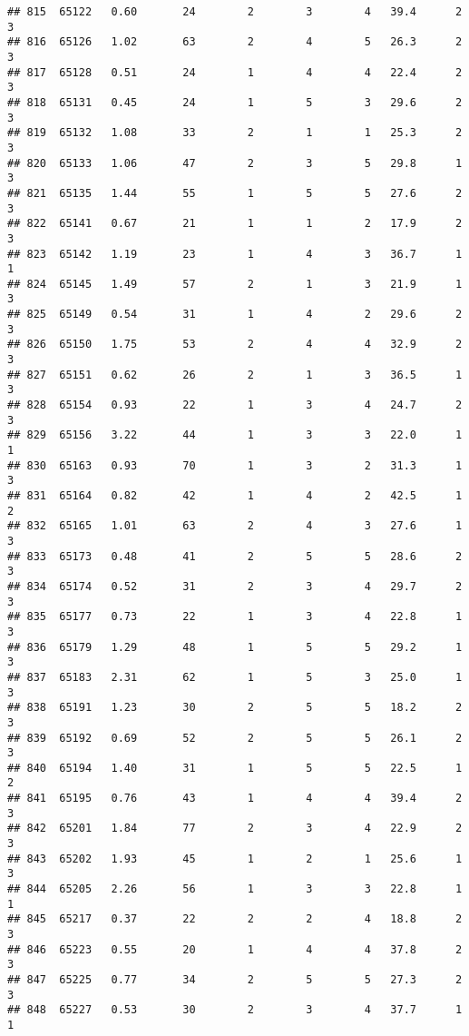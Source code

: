 \documentclass[
]{article}
\begin{document}
\begin{verbatim}
## 815  65122   0.60       24        2        3        4   39.4      2      3
## 816  65126   1.02       63        2        4        5   26.3      2      3
## 817  65128   0.51       24        1        4        4   22.4      2      3
## 818  65131   0.45       24        1        5        3   29.6      2      3
## 819  65132   1.08       33        2        1        1   25.3      2      3
## 820  65133   1.06       47        2        3        5   29.8      1      3
## 821  65135   1.44       55        1        5        5   27.6      2      3
## 822  65141   0.67       21        1        1        2   17.9      2      3
## 823  65142   1.19       23        1        4        3   36.7      1      1
## 824  65145   1.49       57        2        1        3   21.9      1      3
## 825  65149   0.54       31        1        4        2   29.6      2      3
## 826  65150   1.75       53        2        4        4   32.9      2      3
## 827  65151   0.62       26        2        1        3   36.5      1      3
## 828  65154   0.93       22        1        3        4   24.7      2      3
## 829  65156   3.22       44        1        3        3   22.0      1      1
## 830  65163   0.93       70        1        3        2   31.3      1      3
## 831  65164   0.82       42        1        4        2   42.5      1      2
## 832  65165   1.01       63        2        4        3   27.6      1      3
## 833  65173   0.48       41        2        5        5   28.6      2      3
## 834  65174   0.52       31        2        3        4   29.7      2      3
## 835  65177   0.73       22        1        3        4   22.8      1      3
## 836  65179   1.29       48        1        5        5   29.2      1      3
## 837  65183   2.31       62        1        5        3   25.0      1      3
## 838  65191   1.23       30        2        5        5   18.2      2      3
## 839  65192   0.69       52        2        5        5   26.1      2      3
## 840  65194   1.40       31        1        5        5   22.5      1      2
## 841  65195   0.76       43        1        4        4   39.4      2      3
## 842  65201   1.84       77        2        3        4   22.9      2      3
## 843  65202   1.93       45        1        2        1   25.6      1      3
## 844  65205   2.26       56        1        3        3   22.8      1      1
## 845  65217   0.37       22        2        2        4   18.8      2      3
## 846  65223   0.55       20        1        4        4   37.8      2      3
## 847  65225   0.77       34        2        5        5   27.3      2      3
## 848  65227   0.53       30        2        3        4   37.7      1      1

\end{verbatim}
\end{document}
